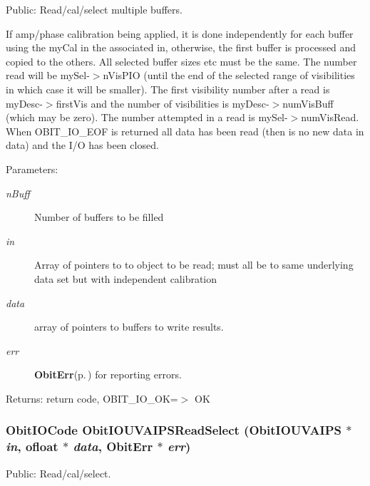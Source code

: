 Public: Read/cal/select multiple buffers. 

If amp/phase calibration being applied, it is done independently for each buffer using the my\-Cal in the associated in, otherwise, the first buffer is processed and copied to the others. All selected buffer sizes etc must be the same. The number read will be my\-Sel-$>$n\-Vis\-PIO (until the end of the selected range of visibilities in which case it will be smaller). The first visibility number after a read is my\-Desc-$>$first\-Vis and the number of visibilities is my\-Desc-$>$num\-Vis\-Buff (which may be zero). The number attempted in a read is my\-Sel-$>$num\-Vis\-Read. When OBIT\_\-IO\_\-EOF is returned all data has been read (then is no new data in data) and the I/O has been closed. \begin{Desc}
\item[Parameters:]
\begin{description}
\item[{\em n\-Buff}]Number of buffers to be filled \item[{\em in}]Array of pointers to to object to be read; must all be to same underlying data set but with independent calibration \item[{\em data}]array of pointers to buffers to write results. \item[{\em err}]{\bf Obit\-Err}{\rm (p.\,\pageref{structObitErr})} for reporting errors. \end{description}
\end{Desc}
\begin{Desc}
\item[Returns:]return code, OBIT\_\-IO\_\-OK=$>$ OK \end{Desc}
\subsubsection{\setlength{\rightskip}{0pt plus 5cm}Obit\-IOCode Obit\-IOUVAIPSRead\-Select ({\bf Obit\-IOUVAIPS} $\ast$ {\em in}, {\bf ofloat} $\ast$ {\em data}, {\bf Obit\-Err} $\ast$ {\em err})}\label{ObitIOUVAIPS_8c_a20}


Public: Read/cal/select. 

